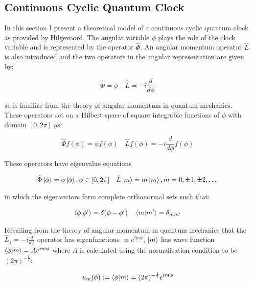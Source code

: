 \documentclass{article}
\begin{document}
\subsection{Continuous Cyclic Quantum Clock}

In this section I present a theoretical model of a continuous cyclic quantum clock as provided by Hilgevoord. The angular variable $\phi$ plays the role of the clock variable and is represented by the operator $\hat{\Phi}$. An angular momentum operator $\hat{L}$ is also introduced and the two operators in the angular representation are given by:

\begin{equation}
	\hat{\Phi} = \phi \quad \hat{L} = -i \frac{d}{d\phi}
\end{equation}

\noindent as is familiar from the theory of angular momentum in quantum mechanics. These operators act on a Hilbert space of square integrable functions of $\phi$ with domain $[0,2\pi]$ as:

\begin{equation}
	\hat{\Phi} f(\phi) = \phi f(\phi) \quad \hat{L} f(\phi) = -i \frac{d}{d\phi}f(\phi)
\end{equation}

\noindent These operators have eigenvalue equations 

\begin{equation}
	\hat{\Phi}\ket{\phi} = \phi\ket{\phi}, \phi \in [0,2\pi] \quad \hat{L}\ket{m} = m\ket{m}, m = 0, \pm 1, \pm 2,\dots
\end{equation}

\noindent in which the eigenvectors form complete orthonormal sets such that:

\begin{equation}
	\braket{\phi|\phi'} = \delta(\phi-\phi ') \quad \braket{m|m'} = \delta_{mm'}
\end{equation}

\noindent Recalling from the theory of angular momentum in quantum mechanics that the $\hat{L}_z = -i \frac{d}{d\phi}$ operator has eigenfunctions $\propto e^{im\phi}$, $\ket{m}$ has wave function $\braket{\phi|m}= Ae^{im\phi}$ where $A$ is calculated using the normalisation condition to be $(2\pi)^{-\frac{1}{2}}$:

\begin{equation}
	u_m(\phi) := \braket{\phi|m} = (2\pi)^{-\frac{1}{2}}e^{im\phi}
\end{equation}
\end{document}
